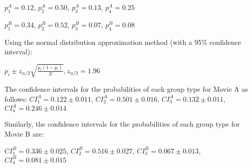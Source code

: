 $p_1^{A} =  0.12$, $p_2^{A} =  0.50$, $p_3^{A} = 0.13$, $p_4^{A} = 0.25$

$p_1^{B} =  0.34$, $p_2^{B} =  0.52$, $p_3^{B} = 0.07$, $p_4^{B} = 0.08$

Using the normal distribution approximation method (with a 95\% confidence interval):

${p}_i \pm z_{\alpha / 2} \sqrt{\frac{{p}_i\left(1-{p}_i\right)}{N}}, z_{\alpha / 2} = 1.96$

The confidence intervals for the probabilities of each group type for Movie A as follows: 
$CI_1^{A} =  0.122 \pm 0.011$, $CI_2^{A} =  0.501 \pm 0.016$, $CI_3^{A} = 0.132 \pm 0.011$, $CI_4^{A} = 0.246 \pm 0.014$

Similarly, the confidence intervals for the probabilities of each group type for Movie B are:

$CI_1^{B} =  0.336 \pm 0.025$, $CI_2^{B} =  0.516 \pm 0.027$, $CI_3^{B} = 0.067 \pm 0.013$, $CI_4^{B} = 0.081 \pm 0.015$
